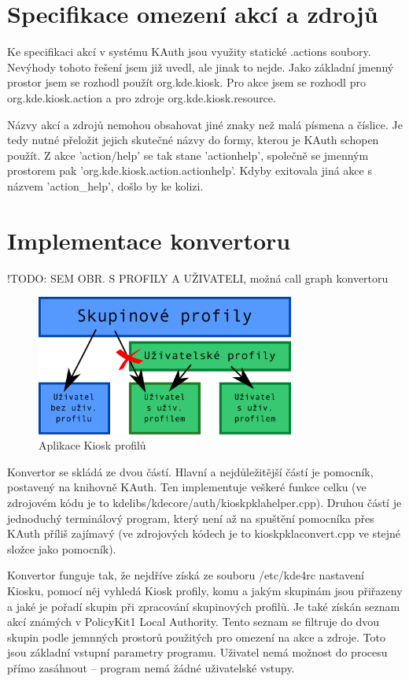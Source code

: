\section{Specifikace omezení akcí a zdrojů}
Ke specifikaci akcí v systému KAuth jsou využity statické .actions soubory.
Nevýhody tohoto řešení jsem již uvedl, ale jinak to nejde. Jako základní jmenný
prostor jsem se rozhodl použít org.kde.kiosk. Pro akce jsem se rozhodl pro
org.kde.kiosk.action a pro zdroje org.kde.kiosk.resource.

Názvy akcí a zdrojů nemohou obsahovat jiné znaky než malá písmena a číslice. Je
tedy nutné přeložit jejich skutečné názvy do formy, kterou je KAuth schopen
použít. Z akce 'action/help' se tak stane 'actionhelp', společně se jmenným
prostorem pak 'org.kde.kiosk.action.actionhelp'. Kdyby exitovala jiná akce
s názvem  'action\_help', došlo by ke kolizi.

\section{Implementace konvertoru}

!TODO: SEM OBR. S PROFILY A UŽIVATELI, možná call graph konvertoru
\begin{figure}[h]
    \centering
    \includegraphics[width=8.5cm]{obrazky/profily.pdf}
    \caption{Aplikace Kiosk profilů}
    \label{fig:konv_profily}
\end{figure}

Konvertor se skládá ze dvou částí. Hlavní a nejdůležitější částí je pomocník,
postavený na knihovně KAuth. Ten implementuje veškeré funkce celku (ve zdrojovém
kódu je to kdelibs/kdecore/auth/kioskpklahelper.cpp). Druhou částí je jednoduchý
terminálový program, který není až na spuštění pomocníka přes KAuth příliš
zajímavý (ve zdrojových kódech je to kioskpklaconvert.cpp ve stejné
složce jako pomocník).

Konvertor funguje tak, že nejdříve získá ze souboru /etc/kde4rc nastavení
Kiosku, pomocí něj vyhledá Kiosk profily, komu a jakým skupinám jsou přiřazeny
a jaké je pořadí skupin při zpracování skupinových profilů. Je také získán
seznam akcí známých v PolicyKit1 Local Authority. Tento seznam se filtruje do
dvou skupin podle jemnných prostorů použitých pro omezení na akce a zdroje.
Toto jsou základní vstupní parametry programu. Uživatel nemá možnost do procesu
přímo zasáhnout -- program nemá žádné uživatelské vstupy.

